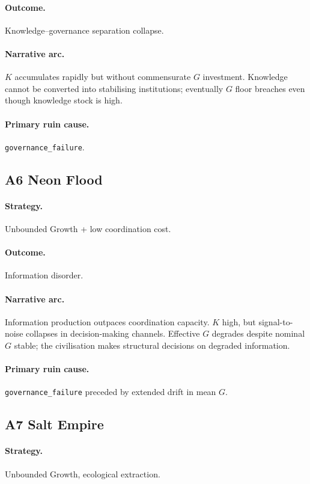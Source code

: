 \paragraph{Outcome.} Knowledge--governance separation collapse.
\paragraph{Narrative arc.}
$K$ accumulates rapidly but without commensurate $G$
investment. Knowledge cannot be converted into stabilising
institutions; eventually $G$ floor breaches even though knowledge
stock is high.
\paragraph{Primary ruin cause.} \texttt{governance\_failure}.

\subsection{A6 Neon Flood}
\label{civ:a6}

\paragraph{Strategy.} Unbounded Growth + low coordination cost.
\paragraph{Outcome.} Information disorder.
\paragraph{Narrative arc.}
Information production outpaces coordination capacity. $K$
high, but signal-to-noise collapses in decision-making channels.
Effective $G$ degrades despite nominal $G$ stable; the
civilisation makes structural decisions on degraded information.
\paragraph{Primary ruin cause.} \texttt{governance\_failure}
preceded by extended drift in mean $G$.

\subsection{A7 Salt Empire}
\label{civ:a7}

\paragraph{Strategy.} Unbounded Growth, ecological extraction.
